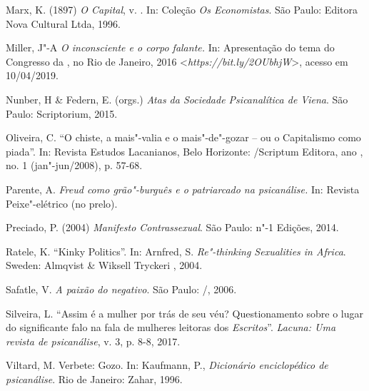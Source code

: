 Marx, K. (1897) \emph{O Capital}, v. . In: Coleção \emph{Os
Economistas}. São Paulo: Editora Nova Cultural Ltda, 1996.

Miller, J"-A \emph{O inconsciente e o corpo falante.} In: Apresentação do
tema do  Congresso da , no Rio de Janeiro, 2016
\textless{}\emph{https://bit.ly/2OUbhjW}\textgreater{}, acesso em 10/04/2019.

Nunber, H \& Federn, E. (orgs.) \emph{Atas da Sociedade Psicanalítica de
Viena}. São Paulo: Scriptorium, 2015.

Oliveira, C. ``O chiste, a mais"-valia e o mais"-de"-gozar -- ou o
Capitalismo como piada''. In: Revista Estudos Lacanianos, Belo
Horizonte: /Scriptum Editora, ano , no. 1 (jan"-jun/2008), p.
57-68.

Parente, A. \emph{Freud como grão"-burguês e o patriarcado na
psicanálise.} In: Revista Peixe"-elétrico (no prelo).

Preciado, P. (2004) \emph{Manifesto Contrassexual}. São Paulo: n"-1
Edições, 2014.

Ratele, K. ``Kinky Politics''. In: Arnfred, S. \emph{Re"-thinking
Sexualities in Africa}. Sweden: Almqvist \& Wiksell Tryckeri , 2004.

Safatle, V. \emph{A paixão do negativo}. São Paulo: /, 2006.

Silveira, L. ``Assim é a mulher por trás de seu véu? Questionamento
sobre o lugar do significante falo na fala de mulheres leitoras dos
\emph{Escritos}''. \emph{Lacuna: Uma revista de psicanálise}, v. 3, p.
8-8, 2017.

Viltard, M. Verbete: Gozo. In: Kaufmann, P., \emph{Dicionário
enciclopédico de psicanálise}. Rio de Janeiro: Zahar, 1996.
